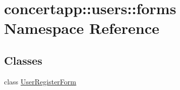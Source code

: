 \hypertarget{namespaceconcertapp_1_1users_1_1forms}{
\section{concertapp::users::forms Namespace Reference}
\label{namespaceconcertapp_1_1users_1_1forms}
}
\subsection*{Classes}
\begin{DoxyCompactItemize}
\item 
class \hyperlink{classconcertapp_1_1users_1_1forms_1_1_user_register_form}{UserRegisterForm}
\end{DoxyCompactItemize}
